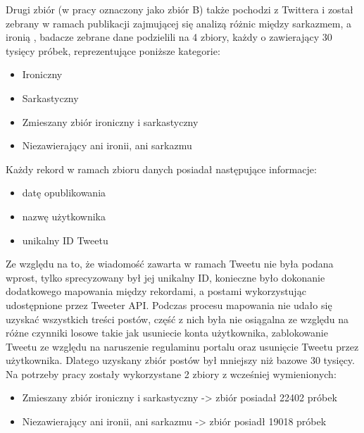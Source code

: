 \hfill

\noindent Drugi zbiór (w pracy oznaczony jako zbiór B) także pochodzi z Twittera i został zebrany w ramach publikacji zajmującej się analizą różnic między sarkazmem, a ironią  \cite{Ling2016}  , badacze zebrane dane podzielili na 4 zbiory, każdy o zawierający 30 tysięcy próbek,  reprezentujące poniższe kategorie:
\begin{itemize}
    \item Ironiczny
    \item Sarkastyczny
    \item Zmieszany zbiór ironiczny i sarkastyczny
    \item Niezawierający ani ironii, ani sarkazmu

\end{itemize}

Każdy rekord w ramach zbioru danych posiadał następujące informacje:
\begin{itemize}
    \item datę opublikowania
    \item nazwę użytkownika
    \item unikalny ID Tweetu
\end{itemize}




Ze względu na to, że wiadomość zawarta w ramach Tweetu nie była podana wprost, tylko sprecyzowany był jej unikalny ID, konieczne było dokonanie dodatkowego mapowania między rekordami, a postami wykorzystując udostępnione przez Tweeter API. Podczas procesu mapowania nie udało się uzyskać wszystkich treści postów, część z nich była nie osiągalna ze względu na różne czynniki losowe takie jak usuniecie konta użytkownika, zablokowanie Tweetu ze względu na naruszenie regulaminu portalu oraz usunięcie Tweetu przez użytkownika. Dlatego uzyskany zbiór postów był mniejszy niż bazowe 30 tysięcy.  
Na potrzeby pracy zostały wykorzystane 2 zbiory z wcześniej wymienionych:
\begin{itemize}
    \item Zmieszany zbiór ironiczny i sarkastyczny -> zbiór posiadał 22402 próbek
    \item Niezawierający ani ironii, ani sarkazmu -> zbiór posiadł 19018 próbek
\end{itemize}


